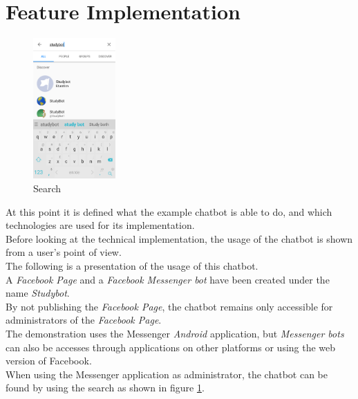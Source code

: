 \section{Feature Implementation}
\label{implementation}


\begin{figure}
  \centering
  \includegraphics[width=0.28\textwidth]{images/interface/01-search.png}
	\caption{Search}
	\label{fig:01-search}
\end{figure}

At this point it is defined what the example chatbot is able to do,
and which technologies are used for its implementation.
\\

Before looking at the technical implementation,
the usage of the chatbot is shown from a user's point of view.
\\
The following is a presentation of the usage of this chatbot.
\\

A \emph{Facebook Page} and a \emph{Facebook Messenger bot} have been created under the name \emph{Studybot}.
\\
By not publishing the \emph{Facebook Page}, the chatbot remains only accessible for administrators of the \emph{Facebook Page}.
\\

The demonstration uses the Messenger \emph{Android} application,
but \emph{Messenger bots} can also be accesses through applications on other platforms
or using the web version of Facebook.
\\

When using the Messenger application as administrator,
the chatbot can be found by using the search as shown in figure \ref{fig:01-search}.
\\


